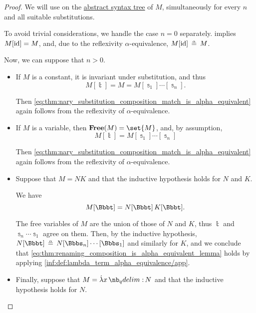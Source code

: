 \begin{proof}
  We will use  on the \hyperref[def:lambda_term_ast]{abstract syntax tree} of \( M \), simultaneously for every \( n \) and all suitable substitutions.

  To avoid trivial considerations, we handle the case \( n = 0 \) separately.  implies \( M[\operatorname{id}] = M \), and, due to the reflexivity \( \alpha \)-equivalence, \( M[\id] \aequiv M \).

  Now, we can suppose that \( n > 0 \).

  \begin{itemize}
    \item If \( M \) is a constant, it is invariant under substitution, and thus
    \begin{equation*}
      M[\Bbbt] = M = M[\Bbbs_1] \cdots [\Bbbs_n].
    \end{equation*}

    Then \eqref{eq:thm:nary_substitution_composition_match_is_alpha_equivalent} again follows from the reflexivity of \( \alpha \)-equivalence.

    \item If \( M \) is a variable, then \( \op*{Free}(M) = \set{ M } \), and, by assumption,
    \begin{equation*}
      M[\Bbbt] = M[\Bbbs_1] \cdots [\Bbbs_n]
    \end{equation*}

    Then \eqref{eq:thm:nary_substitution_composition_match_is_alpha_equivalent} again follows from the reflexivity of \( \alpha \)-equivalence.

    \item Suppose that \( M = NK \) and that the inductive hypothesis holds for \( N \) and \( K \).

    We have
    \begin{equation*}
      M[\Bbbt] = N[\Bbbt] \thinspace K[\Bbbt].
    \end{equation*}

    The free variables of \( M \) are the union of those of \( N \) and \( K \), thus \( \Bbbt \) and \( \Bbbs_n \cdots \Bbbs_1 \) agree on them. Then, by the inductive hypothesis, \( N[\Bbbt] \aequiv N[\Bbbs_n] \cdots [\Bbbs_1] \) and similarly for \( K \), and we conclude that \eqref{eq:thm:renaming_composition_is_alpha_equivalent_lemma} holds by applying \ref{inf:def:lambda_term_alpha_equivalence/app}.

    \item Finally, suppose that \( M = \qabs x N \) and that the inductive hypothesis holds for \( N \).


\end{itemize}
\end{proof}
